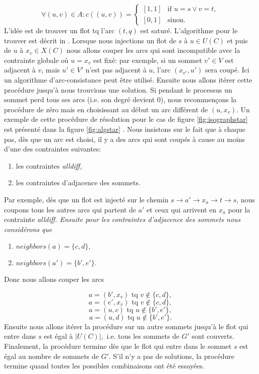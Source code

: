 \documentclass[french]{article}
\theoremstyle{definition}
\theoremstyle{remark}
\begin{document}
\[  \forall (u,v) \in A:
c((u,v))= 
\begin{cases}
[1,1]& \text{if } u=s \lor v=t,\\
[0,1]              & \text{sinon}.
\end{cases}
\]
L'idée est de trouver un flot tq l'arc $(t,q)$ est saturé. L'algorithme pour le trouver est décrit in \cite{regin}.
Lorsque nous injections un flot de $s$ à $u \in U(C)$ et puis de $u$ à $x_v \in X(C)$ nous allons couper les arcs qui sont incompatible avec la contrainte globale où $u=x_v$ est fixé: par exemple, si un sommet $v' \in V$ est adjacent à $v$, mais $u' \in V'$ n'est pas adjacent à $u$, l'arc $(x_{v'},u')$ sera coupé. Ici un algorithme d'arc-consistance peut être utilisé. Ensuite nous allons itérer cette procédure jusqu'à nous trouvions une solution. Si pendant le processus un sommet perd tous ses arcs (i.e. son degré devient $0$), nous recommençons la procédure de zéro mais en choisissant au début un arc différent de $(u, x_v).$
Un exemple de cette procédure de résolution pour le cas de figure \ref{fig:isographstar} est présenté dans la figure \ref{fig:algstar} . Nous insistons sur le fait que à chaque pas, dès que un arc est choisi, il y a des arcs qui sont coupés à cause au moins d'une des contraintes suivantes:
\begin{enumerate}
	\item les contraintes \it alldiff, \rm
	\item les contraintes d'adjacence des sommets.
\end{enumerate}
Par exemple, dès que un flot est injecté sur le chemin $s \rightarrow a' \rightarrow x_a \rightarrow t \rightarrow s$, nous coupons tous les autres arcs qui partent de $a'$ et ceux qui arrivent en $x_a$ pour la contrainte \it alldiff. \rm Ensuite pour les contraintes d'adjacence des sommets nous considérons que
\begin{enumerate}
	\item $neighbors(a)=\{c, d\},$
	\item $neighbors(a')=\{b', e'\}.$
\end{enumerate}
Donc nous allons couper les arcs

$$ a=(b', x_v) \text{ tq } v \notin \{c,d\} , $$
$$ a=(e', x_v) \text{ tq } v \notin \{c,d\}, $$
$$ a=(u, c) \text{ tq } u \notin \{b',e'\}, $$
$$ a=(u, d) \text{ tq } u \notin \{b',e'\}. $$
Ensuite nous allons itérer la procédure sur un autre sommets jusqu'à le flot qui entre dans $s$ est égal à $|U(C)|,$ i.e. tous les sommets de $G'$ sont couverts. Finalement, la procédure termine dès que le flot qui entre dans le sommet $s$ est égal au nombre de sommets de $G'$. S'il n'y a pas de solutions, la procédure termine quand toutes les possibles combinaisons ont été essayées.
\end{document}
